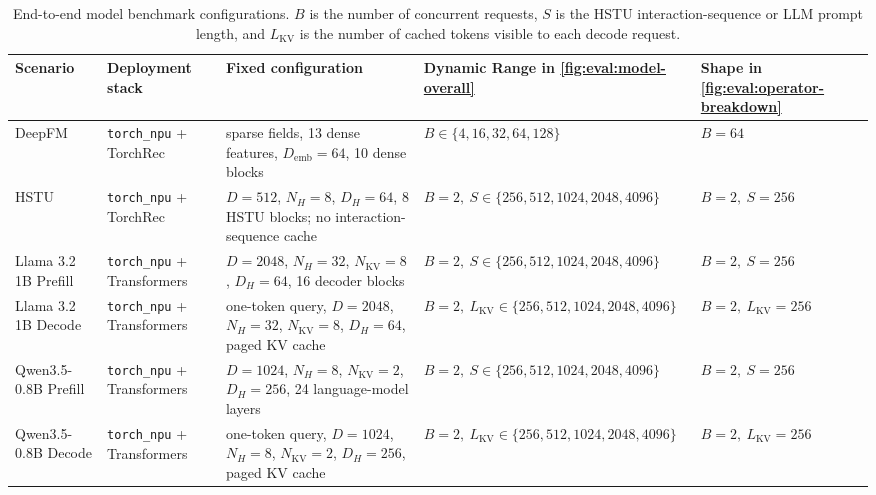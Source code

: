 \documentclass[manuscript,screen,review]{acmart}
\theoremstyle{indenteditalic}
\begin{document}
\begin{table}[t]
    \centering
    \caption{End-to-end model benchmark configurations. $B$ is the number of concurrent requests, $S$ is the HSTU interaction-sequence or LLM prompt length, and $L_{\mathrm{KV}}$ is the number of cached tokens visible to each decode request.}
    \label{tab:eval:model-configs}
    \scriptsize
    \setlength{\tabcolsep}{3pt}
    \renewcommand{\arraystretch}{0.92}
    \begin{tabularx}{\textwidth}{@{}
        >{\raggedright\arraybackslash}p{}
        >{\raggedright\arraybackslash}p{}
        >{\raggedright\arraybackslash}X
        >{\raggedright\arraybackslash}p{}
        >{\raggedright\arraybackslash}p{}
        @{}}
        \toprule
        \textbf{Scenario} & \textbf{Deployment stack} & \textbf{Fixed configuration} & \textbf{Dynamic Range in \autoref{fig:eval:model-overall}} & \textbf{Shape in \autoref{fig:eval:operator-breakdown}} \\
        \midrule
        DeepFM &
        \texttt{torch\_npu} + TorchRec &
        20 sparse fields, 13 dense features, $D_{\mathrm{emb}}=64$, 10 dense blocks &
        $B\in\{4,16,32,64,128\}$ &
        $B=64$ \\
        HSTU &
        \texttt{torch\_npu} + TorchRec &
        $D=512$, $N_H=8$, $D_H=64$, 8 HSTU blocks; no interaction-sequence cache &
        $B=2,\ S\in\{256,512,1024,2048,4096\}$ &
        $B=2,\ S=256$ \\
        Llama 3.2 1B Prefill &
        \texttt{torch\_npu} + Transformers &
        $D=2048$, $N_H=32$, $N_{\mathrm{KV}}=8$, $D_H=64$, 16 decoder blocks &
        $B=2,\ S\in\{256,512,1024,2048,4096\}$ &
        $B=2,\ S=256$ \\
        Llama 3.2 1B Decode &
        \texttt{torch\_npu} + Transformers &
        one-token query, $D=2048$, $N_H=32$, $N_{\mathrm{KV}}=8$, $D_H=64$, paged KV cache &
        $B=2,\ L_{\mathrm{KV}}\in\{256,512,1024,2048,4096\}$ &
        $B=2,\ L_{\mathrm{KV}}=256$ \\
        Qwen3.5-0.8B Prefill &
        \texttt{torch\_npu} + Transformers &
        $D=1024$, $N_H=8$, $N_{\mathrm{KV}}=2$, $D_H=256$, 24 language-model layers &
        $B=2,\ S\in\{256,512,1024,2048,4096\}$ &
        $B=2,\ S=256$ \\
        Qwen3.5-0.8B Decode &
        \texttt{torch\_npu} + Transformers &
        one-token query, $D=1024$, $N_H=8$, $N_{\mathrm{KV}}=2$, $D_H=256$, paged KV cache &
        $B=2,\ L_{\mathrm{KV}}\in\{256,512,1024,2048,4096\}$ &
        $B=2,\ L_{\mathrm{KV}}=256$ \\
        \bottomrule
    \end{tabularx}
\end{table}
\end{document}
